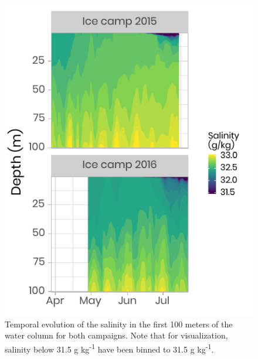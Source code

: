 \documentclass[12pt,a4paper]{scrartcl}
\begin{document}
\begin{figure}[h]
	\centering
	\includegraphics[scale = 2]{../../../graphs/fig03.pdf}
	\caption{Temporal evolution of the salinity in the first 100 meters of the water column for both campaigns. Note that for visualization, salinity below 31.5 g kg\textsuperscript{-1} have been binned to 31.5 g kg\textsuperscript{-1}.}
\end{figure}

\clearpage
\newpage
\end{document}
